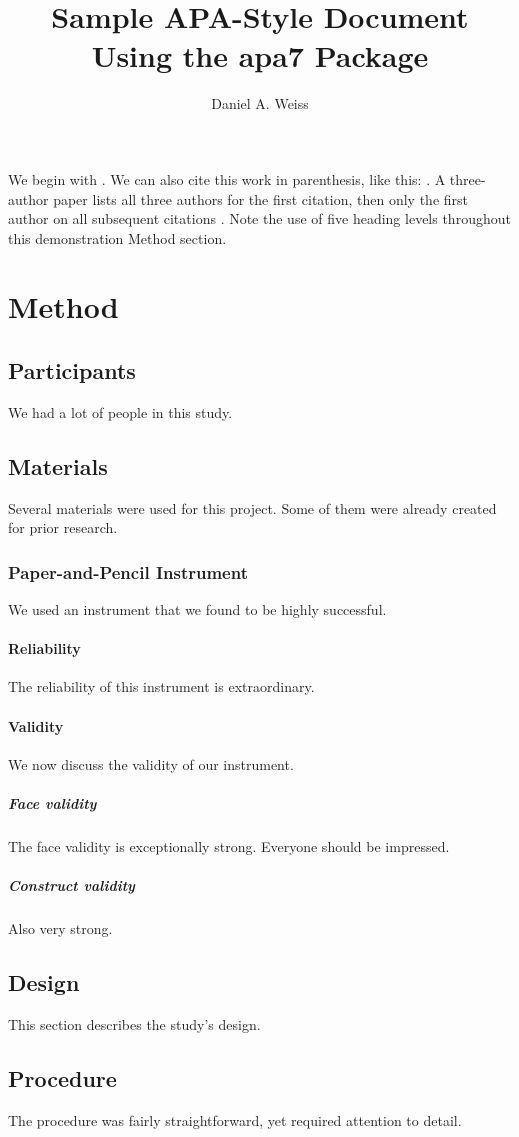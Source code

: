 \documentclass[jou]{apa7}
\title{Sample APA-Style Document Using the \textsf{apa7} Package}
\author{Daniel A. Weiss}
\affiliation{A University Somewhere}
\begin{document}
\maketitle
We begin with \textcite{Lane12a}. We can also cite this work in
parenthesis, like this: \parencite{Lane12a}.
A three-author paper \parencite[e.g.,][]{Lane12a} lists all
three authors for the first citation, then only the first author
on all subsequent citations \parencite{Lane12a}.
Note the use of five heading levels throughout this demonstration
Method section.
\section{Method}
\subsection{Participants}
We had a lot of people in this study.
\subsection{Materials}
Several materials were used for this project. Some of them were
already created for prior research.
\subsubsection{Paper-and-Pencil Instrument}
We used an instrument that we found to be highly successful.
\paragraph{Reliability}
The reliability of this instrument is extraordinary.
\paragraph{Validity}
We now discuss the validity of our instrument.
\subparagraph{Face validity} The face validity is exceptionally
strong. Everyone should be impressed.
\subparagraph{Construct validity} Also very strong.
\subsection{Design}
This section describes the study’s design.
\subsection{Procedure}
The procedure was fairly straightforward, yet required
attention to detail.
\end{document}
